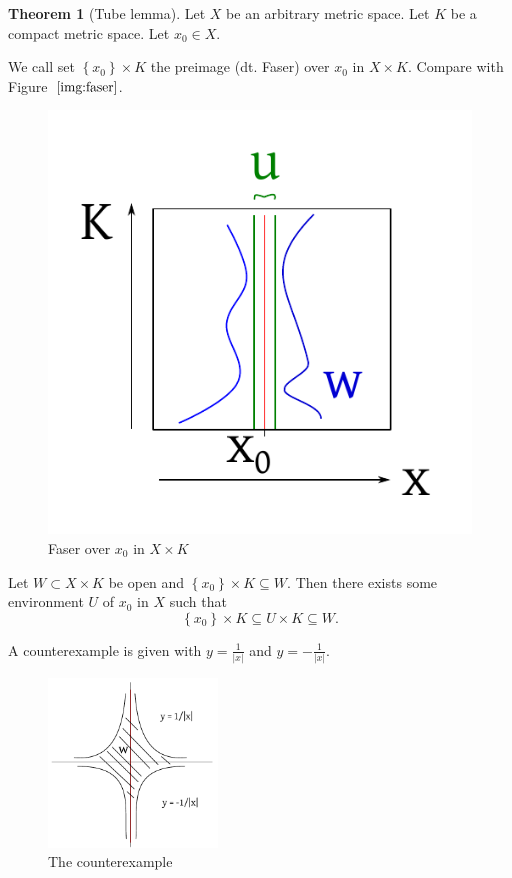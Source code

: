 \documentclass[a4paper,landscape,twocolumn]{article}
\theoremstyle{definition}
\newtheorem{theorem}{Theorem}
\newcommand\set[1]{\left\{#1\right\}}
\newcommand\abs[1]{\left|#1\right|}
\begin{document}
\begin{theorem}[Tube lemma]
  \label{tube-lemma}
  Let $X$ be an arbitrary metric space.
  Let $K$ be a compact metric space.
  Let $x_0 \in X$.

  We call set $\set{x_0} \times K$ the preimage (dt. Faser) over $x_0$ in $X \times K$.
  Compare with Figure~$\ref{img:faser}$.
  \begin{figure}[!h]
    \begin{center}
      \includegraphics{img/faser.pdf}
      \caption{Faser over $x_0$ in $X \times K$}
      \label{img:faser}
    \end{center}
  \end{figure}

  Let $W \subset X \times K$ be open and $\set{x_0} \times K \subseteq W$.
  Then there exists some environment $U$ of $x_0$ in $X$ such that
  \[ \set{x_0} \times K \subseteq U \times K \subseteq W. \]

  A counterexample is given with $y = \frac{1}{\abs{x}}$ and $y = -\frac{1}{\abs{x}}$.
  \begin{figure}[!h]
    \begin{center}
      \includegraphics[width=0.4\textwidth]{img/counterexample.pdf}
      \caption{The counterexample}
      \label{img:counterexample}
    \end{center}
  \end{figure}
\end{theorem}
\end{document}
